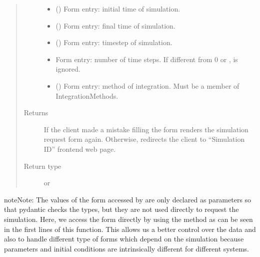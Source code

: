 \documentclass[a4paper,landscape,10pt,english]{sphinxmanual}
\begin{document}
\begin{fulllineitems}
\begin{quote}
\begin{description}
\begin{itemize}
\item {} 
 () \textendash{} Form entry: initial time of simulation.

\item {} 
 () \textendash{} Form entry: final time of simulation.

\item {} 
 () \textendash{} Form entry: timestep of simulation.

\item {} 
 \textendash{} Form entry: number of time steps. If different from 0 or ,
 is ignored.

\item {} 
 ({\hyperref[\detokenize{code_docs/simulation_API.controller:simulation_API.controller.schemas.IntegrationMethods}]{}}) \textendash{} Form entry: method of integration. Must be a member of
IntegrationMethods.

\end{itemize}

\item[{Returns}] \leavevmode
If the client made a mistake filling the form renders the simulation
request form again. Otherwise, redirects the client to “Simulation ID”
frontend web page.

\item[{Return type}] \leavevmode
{} or 

\end{description}\end{quote}

\begin{sphinxadmonition}{note}{Note:}
The values of the form accessed by  are only
declared as parameters so that pydantic checks the types, but they are not
used directly to request the simulation.
Here, we access the form directly
by using the method  as can be seen in the
first lines of this function. This allows us a better control over the data
and also to handle different type of forms \textendash{}which depend on the simulation
because parameters and initial conditions are intrinsically different for
different systems.
\end{sphinxadmonition}

\end{fulllineitems}
\end{document}
